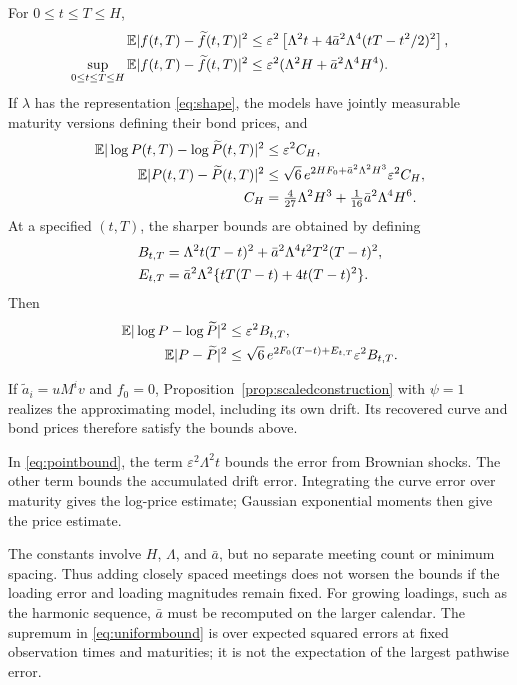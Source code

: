 \begin{theorem}\label{thm:approximation}
For $0\le t\le T\le H$,
\begin{align}
\mathbb E|f(t,T)-\widetilde f(t,T)|^2
&\le\varepsilon^2\left[\Lambda^2t+4\bar a^2\Lambda^4(tT-t^2/2)^2\right],\label{eq:pointbound}\\
\sup_{0\le t\le T\le H}\mathbb E|f(t,T)-\widetilde f(t,T)|^2
&\le\varepsilon^2(\Lambda^2H+\bar a^2\Lambda^4H^4).\label{eq:uniformbound}
\end{align}
If $\lambda$ has the representation \eqref{eq:shape}, the models have jointly measurable maturity versions defining their bond prices, and
\begin{align}
\mathbb E|\log P(t,T)-\log\widetilde P(t,T)|^2&\le\varepsilon^2 C_H,\label{eq:logbound}\\
\mathbb E|P(t,T)-\widetilde P(t,T)|^2&\le\sqrt6\,e^{2HF_0+\bar a^2\Lambda^2H^3}\varepsilon^2 C_H,\label{eq:pricebound}\\
C_H&=\tfrac4{27}\Lambda^2H^3+\tfrac1{16}\bar a^2\Lambda^4H^6.\notag
\end{align}
At a specified $(t,T)$, the sharper bounds are obtained by defining
\begin{align}
B_{t,T}&=\Lambda^2t(T-t)^2+\bar a^2\Lambda^4t^2T^2(T-t)^2,\notag\\
E_{t,T}&=\bar a^2\Lambda^2\{tT(T-t)+4t(T-t)^2\}.\notag
\end{align}
Then
\begin{align}
\mathbb E|\log P-\log\widetilde P|^2&\le\varepsilon^2B_{t,T},\label{eq:pointlog}\\
\mathbb E|P-\widetilde P|^2&\le\sqrt6\,e^{2F_0(T-t)+E_{t,T}}\varepsilon^2B_{t,T}.\label{eq:pointprice}
\end{align}
\end{theorem}
\begin{remark}
If $\widetilde a_i=uM^iv$ and $f_0=0$, Proposition~\ref{prop:scaledconstruction} with $\psi=1$ realizes the approximating model, including its own drift. Its recovered curve and bond prices therefore satisfy the bounds above.
\end{remark}
In \eqref{eq:pointbound}, the term $\varepsilon^2\Lambda^2t$ bounds the error from Brownian shocks. The other term bounds the accumulated drift error. Integrating the curve error over maturity gives the log-price estimate; Gaussian exponential moments then give the price estimate.

The constants involve $H$, $\Lambda$, and $\bar a$, but no separate meeting count or minimum spacing. Thus adding closely spaced meetings does not worsen the bounds if the loading error and loading magnitudes remain fixed. For growing loadings, such as the harmonic sequence, $\bar a$ must be recomputed on the larger calendar. The supremum in \eqref{eq:uniformbound} is over expected squared errors at fixed observation times and maturities; it is not the expectation of the largest pathwise error.

